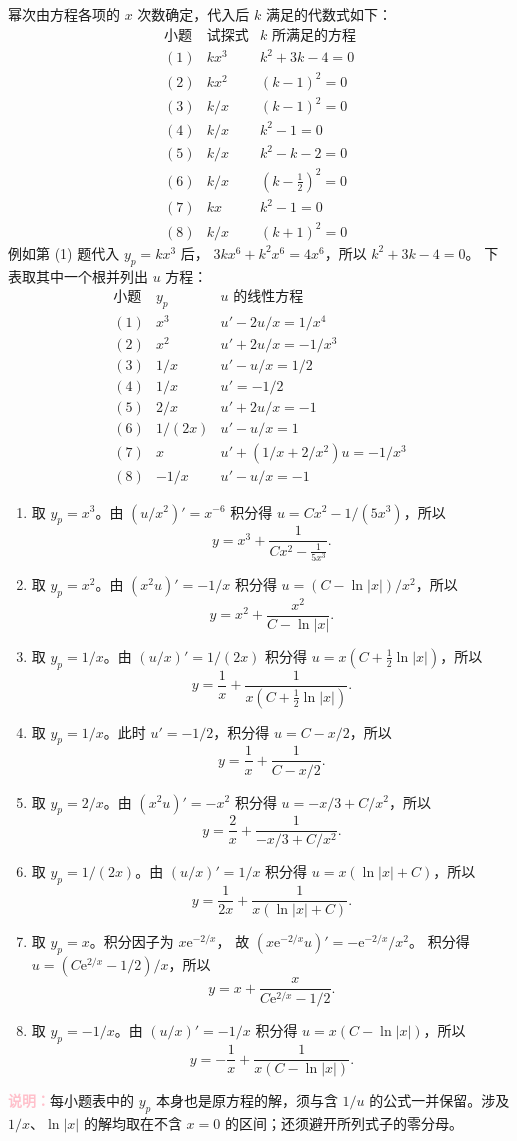 \documentclass[UTF8,a4paper,11pt]{ctexart}
\newcommand{\e}{\mathrm e}
\newcommand{\note}[1]{\par\smallskip\noindent\textcolor{pink}{\bfseries 说明：}#1\par\smallskip}
\begin{document}
\begin{solution}
幂次由方程各项的 $x$ 次数确定，代入后 $k$ 满足的代数式如下：
\[
\begin{array}{c|c|c}
\text{小题}&\text{试探式}&k\text{ 所满足的方程}\\ \hline
(1)&kx^3&k^2+3k-4=0\\
(2)&kx^2&(k-1)^2=0\\
(3)&k/x&(k-1)^2=0\\
(4)&k/x&k^2-1=0\\
(5)&k/x&k^2-k-2=0\\
(6)&k/x&(k-\tfrac12)^2=0\\
(7)&kx&k^2-1=0\\
(8)&k/x&(k+1)^2=0
\end{array}
\]
例如第 (1) 题代入 $y_p=kx^3$ 后，
$3kx^6+k^2x^6=4x^6$，所以 $k^2+3k-4=0$。
下表取其中一个根并列出 $u$ 方程：
\[
\begin{array}{c|c|c}
\text{小题}&y_p&u\text{ 的线性方程}\\ \hline
(1)&x^3&u'-2u/x=1/x^4\\
(2)&x^2&u'+2u/x=-1/x^3\\
(3)&1/x&u'-u/x=1/2\\
(4)&1/x&u'=-1/2\\
(5)&2/x&u'+2u/x=-1\\
(6)&1/(2x)&u'-u/x=1\\
(7)&x&u'+(1/x+2/x^2)u=-1/x^3\\
(8)&-1/x&u'-u/x=-1
\end{array}
\]
\begin{enumerate}[label=(\arabic*)]
\item 取 $y_p=x^3$。由 $(u/x^2)'=x^{-6}$ 积分得
$u=Cx^2-1/(5x^3)$，所以
\[
\boxed{y=x^3+\frac1{Cx^2-\frac1{5x^3}}}.
\]
\item 取 $y_p=x^2$。由 $(x^2u)'=-1/x$ 积分得
$u=(C-\ln|x|)/x^2$，所以
\[
\boxed{y=x^2+\frac{x^2}{C-\ln|x|}}.
\]
\item 取 $y_p=1/x$。由 $(u/x)'=1/(2x)$ 积分得
$u=x(C+\tfrac12\ln|x|)$，所以
\[
\boxed{y=\frac1x+\frac1{x\left(C+\frac12\ln|x|\right)}}.
\]
\item 取 $y_p=1/x$。此时 $u'=-1/2$，积分得
$u=C-x/2$，所以
\[
\boxed{y=\frac1x+\frac1{C-x/2}}.
\]
\item 取 $y_p=2/x$。由 $(x^2u)'=-x^2$ 积分得
$u=-x/3+C/x^2$，所以
\[
\boxed{y=\frac2x+\frac1{-x/3+C/x^2}}.
\]
\item 取 $y_p=1/(2x)$。由 $(u/x)'=1/x$ 积分得
$u=x(\ln|x|+C)$，所以
\[
\boxed{y=\frac1{2x}+\frac1{x(\ln|x|+C)}}.
\]
\item 取 $y_p=x$。积分因子为 $x\e^{-2/x}$，
故 $(x\e^{-2/x}u)'=-\e^{-2/x}/x^2$。
积分得 $u=(C\e^{2/x}-1/2)/x$，所以
\[
\boxed{y=x+\frac{x}{C\e^{2/x}-1/2}}.
\]
\item 取 $y_p=-1/x$。由 $(u/x)'=-1/x$ 积分得
$u=x(C-\ln|x|)$，所以
\[
\boxed{y=-\frac1x+\frac1{x(C-\ln|x|)}}.
\]
\end{enumerate}
\note{每小题表中的 $y_p$ 本身也是原方程的解，须与含 $1/u$ 的公式一并保留。涉及 $1/x$、$\ln|x|$ 的解均取在不含 $x=0$ 的区间；还须避开所列式子的零分母。}
\end{solution}
\end{document}
